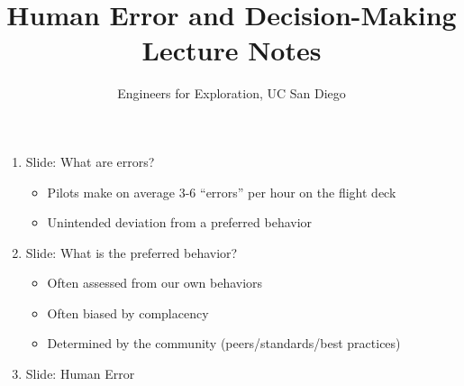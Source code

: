 \documentclass[]{article}
\title{Human Error and Decision-Making Lecture Notes}
\author{Engineers for Exploration, UC San Diego}
\begin{document}
\maketitle
\begin{enumerate}
    \item Slide: What are errors?
    \begin{itemize}
        \item Pilots make on average 3-6 ``errors'' per hour on the flight deck
        \item Unintended deviation from a preferred behavior
    \end{itemize}
    \item Slide: What is the preferred behavior?
    \begin{itemize}
        \item Often assessed from our own behaviors
        \item Often biased by complacency
        \item Determined by the community (peers/standards/best practices)
    \end{itemize}
    \item Slide: Human Error


\end{enumerate}
\end{document}
